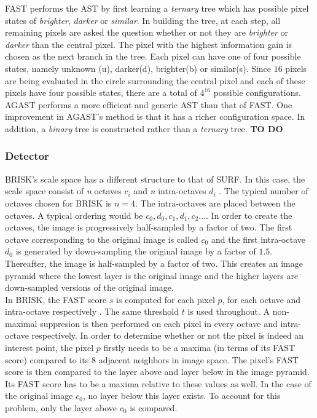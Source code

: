 \documentclass{article}
\begin{document}
FAST performs the AST by first learning a \textit{ternary} tree which has possible pixel states of \textit{brighter}, \textit{darker} or \textit{similar}. In building the tree, at each step, all remaining pixels are asked the question whether or not they are \textit{brighter} or \textit{darker} than the central pixel. The pixel with the highest information gain is chosen as the next branch in the tree. Each pixel can have one of four possible states, namely unknown (u), darker(d), brighter(b) or similar(s). Since $16$ pixels are being evaluated in the circle surrounding the central pixel and each of these pixels have four possible states, there are a total of $4^{16}$ possible configurations. \\

AGAST performs a more efficient and generic AST than that of FAST. One improvement in AGAST's method is that it has a richer configuration space. In addition, a \textit{binary} tree is constructed rather than a \textit{ternary} tree. \textbf{TO DO}\\

\subsubsection{Detector}
\label{briskDetect}
BRISK's scale space has a different structure to that of SURF. In this case, the scale space consist of \textit{n} octaves \textit{$c_i$} and \textit{n} intra-octaves \textit{$d_i$} \cite{Leutenegger2011}. The typical number of octaves chosen for BRISK is $n=4$. The intra-octaves are placed between the octaves. A typical ordering would be $c_0, d_0, c_1, d_1, c_2...$. In order to create the octaves, the image is progressively half-sampled by a factor of two. The first octave corresponding to the original image is called $c_0$ and the first intra-octave $d_0$ is generated by down-sampling the original image by a factor of $1.5$. Thereafter, the image is half-sampled by a factor of two. This creates an image pyramid where the lowest layer is the original image and the higher layers are down-sampled versions of the original image.\\

In BRISK, the FAST score $s$ is computed for each pixel $p$, for each octave and intra-octave respectively \cite{Leutenegger2011}. The same threshold $t$ is used throughout. A non-maximal suppresion is then performed on each pixel in every octave and intra-octave respectively. In order to determine whether or not the pixel is indeed an interest point, the pixel $p$ firstly needs to be a maxima (in terms of its FAST score) compared to its $8$ adjacent neighbors in image space. The pixel's FAST score is then compared to the layer above and layer below in the image pyramid. Its FAST score has to be a maxima relative to these values as well. In the case of the original image $c_0$, no layer below this layer exists. To account for this problem, only the layer above $c_0$ is compared.\\
\end{document}
